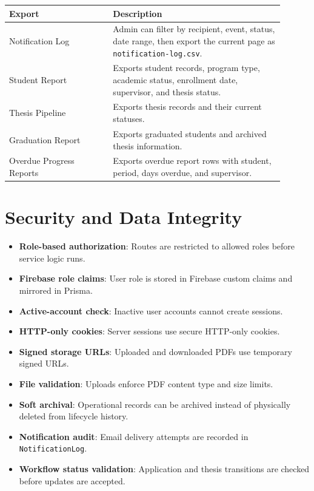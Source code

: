 \documentclass[11pt,a4paper]{article}
\newcommand{\code}[1]{\texttt{#1}}
\begin{document}
\begin{longtable}{p{0.34\linewidth} p{0.56\linewidth}}
\toprule
\textbf{Export} & \textbf{Description} \\
\midrule
Notification Log & Admin can filter by recipient, event, status, date range, then export the current page as \code{notification-log.csv}. \\
Student Report & Exports student records, program type, academic status, enrollment date, supervisor, and thesis status. \\
Thesis Pipeline & Exports thesis records and their current statuses. \\
Graduation Report & Exports graduated students and archived thesis information. \\
Overdue Progress Reports & Exports overdue report rows with student, period, days overdue, and supervisor. \\
\bottomrule
\end{longtable}

\section{Security and Data Integrity}

\begin{itemize}
  \item \textbf{Role-based authorization}: Routes are restricted to allowed roles before service logic runs.
  \item \textbf{Firebase role claims}: User role is stored in Firebase custom claims and mirrored in Prisma.
  \item \textbf{Active-account check}: Inactive user accounts cannot create sessions.
  \item \textbf{HTTP-only cookies}: Server sessions use secure HTTP-only cookies.
  \item \textbf{Signed storage URLs}: Uploaded and downloaded PDFs use temporary signed URLs.
  \item \textbf{File validation}: Uploads enforce PDF content type and size limits.
  \item \textbf{Soft archival}: Operational records can be archived instead of physically deleted from lifecycle history.
  \item \textbf{Notification audit}: Email delivery attempts are recorded in \code{NotificationLog}.
  \item \textbf{Workflow status validation}: Application and thesis transitions are checked before updates are accepted.
\end{itemize}
\end{document}
